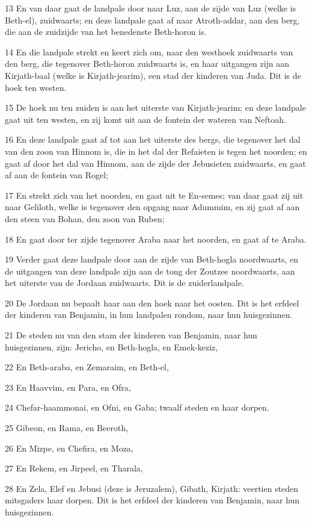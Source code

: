 \par 13 En van daar gaat de landpale door naar Luz, aan de zijde van Luz (welke is Beth-el), zuidwaarts; en deze landpale gaat af naar Atroth-addar, aan den berg, die aan de zuidzijde van het benedenste Beth-horon is.
\par 14 En die landpale strekt en keert zich om, naar den westhoek zuidwaarts van den berg, die tegenover Beth-horon zuidwaarts is, en haar uitgangen zijn aan Kirjath-baal (welke is Kirjath-jearim), een stad der kinderen van Juda. Dit is de hoek ten westen.
\par 15 De hoek nu ten zuiden is aan het uiterste van Kirjath-jearim; en deze landpale gaat uit ten westen, en zij komt uit aan de fontein der wateren van Neftoah.
\par 16 En deze landpale gaat af tot aan het uiterste des bergs, die tegenover het dal van den zoon van Hinnom is, die in het dal der Refaieten is tegen het noorden; en gaat af door het dal van Hinnom, aan de zijde der Jebusieten zuidwaarts, en gaat af aan de fontein van Rogel;
\par 17 En strekt zich van het noorden, en gaat uit te En-semes; van daar gaat zij uit naar Geliloth, welke is tegenover den opgang naar Adummim, en zij gaat af aan den steen van Bohan, den zoon van Ruben;
\par 18 En gaat door ter zijde tegenover Araba naar het noorden, en gaat af te Araba.
\par 19 Verder gaat deze landpale door aan de zijde van Beth-hogla noordwaarts, en de uitgangen van deze landpale zijn aan de tong der Zoutzee noordwaarts, aan het uiterste van de Jordaan zuidwaarts. Dit is de zuiderlandpale.
\par 20 De Jordaan nu bepaalt haar aan den hoek naar het oosten. Dit is het erfdeel der kinderen van Benjamin, in hun landpalen rondom, naar hun huisgezinnen.
\par 21 De steden nu van den stam der kinderen van Benjamin, naar hun huisgezinnen, zijn: Jericho, en Beth-hogla, en Emek-keziz,
\par 22 En Beth-araba, en Zemaraim, en Beth-el,
\par 23 En Haavvim, en Para, en Ofra,
\par 24 Chefar-haammonai, en Ofni, en Gaba; twaalf steden en haar dorpen.
\par 25 Gibeon, en Rama, en Beeroth,
\par 26 En Mizpe, en Chefira, en Moza,
\par 27 En Rekem, en Jirpeel, en Tharala,
\par 28 En Zela, Elef en Jebusi (deze is Jeruzalem), Gibath, Kirjath: veertien steden mitsgaders haar dorpen. Dit is het erfdeel der kinderen van Benjamin, naar hun huisgezinnen.

